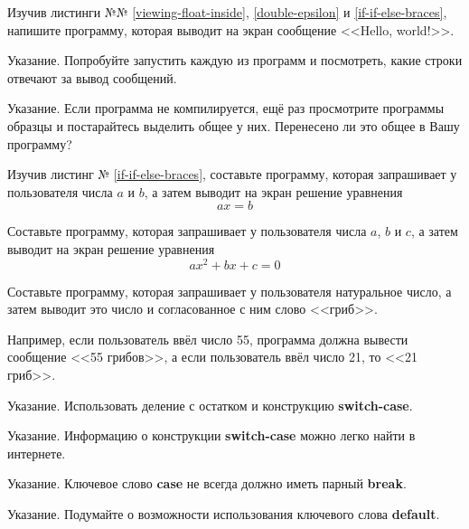 
\labtask

Изучив листинги №№ \ref{viewing-float-inside}, \ref{double-epsilon} и \ref{if-if-else-braces},
напишите программу, которая выводит на экран сообщение <<Hello, world!>>.

Указание.
Попробуйте запустить каждую из программ и посмотреть,
какие строки отвечают за вывод сообщений.

Указание.
Если программа не компилируется,
ещё раз просмотрите программы образцы и постарайтесь выделить общее у них.
Перенесено ли это общее в Вашу программу?


\labtask

Изучив листинг № \ref{if-if-else-braces},
составьте программу, которая запрашивает у пользователя числа $a$ и $b$,
а затем выводит на экран решение уравнения
$$
	ax=b
$$


\labtask

Составьте программу, которая запрашивает у пользователя числа $a$, $b$ и $c$,
а затем выводит на экран решение уравнения
$$
	ax^2+bx+c = 0
$$


\labtask

Составьте программу, которая запрашивает у пользователя натуральное число,
а затем выводит это число и согласованное с ним слово <<гриб>>.

Например, если  пользователь ввёл число 55, программа должна вывести сообщение <<55 грибов>>,
а если пользователь ввёл число 21, то <<21 гриб>>.

Указание.
Использовать деление с остатком и конструкцию \textbf{switch-case}.

Указание.
Информацию о конструкции \textbf{switch-case} можно легко найти в интернете.

Указание.
Ключевое слово \textbf{case} не всегда должно иметь парный \textbf{break}.

Указание.
Подумайте о возможности использования ключевого слова \textbf{default}.
